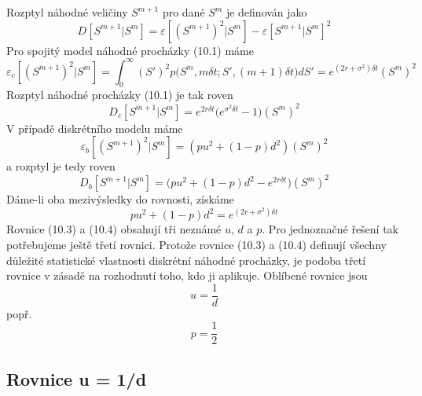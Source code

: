 \documentclass[a4paper]{book}
\begin{document}
Rozptyl náhodné veličiny $S^{m+1}$ pro dané $S^m$ je definován jako
\begin{equation*}
D[S^{m+1}|S^m] = \varepsilon[(S^{m+1})^2|S^m] - \varepsilon[S^{m+1}|S^m]^2
\end{equation*}
Pro spojitý model náhodné procházky (10.1) máme
\begin{equation*}
\varepsilon_c[(S^{m+1})^2|S^m] = \int_0^{\infty} (S')^2  p \Big( S^m, m \delta t; S', (m+1)\delta t \Big) dS' = e^{(2r + \sigma^2)\delta t}(S^m)^2
\end{equation*}
Rozptyl náhodné procházky (10.1) je tak roven
\begin{equation*}
D_c[S^{m+1}|S^m] = e^{2r \delta t} \Big( e^{\sigma^2 \delta t} - 1\Big)(S^m)^2
\end{equation*}
V případě diskrétního modelu máme
\begin{equation*}
\varepsilon_b[(S^{m+1})^2|S^m] = (pu^2 + (1-p)d^2)(S^m)^2
\end{equation*}
a rozptyl je tedy roven
\begin{equation*}
D_b[S^{m+1}|S^m] = \Big( pu^2 + (1 - p)d^2 - e^{2r\delta t}\Big)(S^m)^2
\end{equation*}
Dáme-li oba mezivýsledky do rovnosti, získáme
\begin{equation}
pu^2 + (1 - p)d^2 = e^{(2r + \sigma^2)\delta t}
\end{equation}
Rovnice (10.3) a (10.4) obsahují tři neznámé $u$, $d$ a $p$. Pro jednoznačné řešení tak potřebujeme ještě třetí rovnici. Protože rovnice (10.3) a (10.4) definují všechny důležité statistické vlastnosti diskrétní náhodné procházky, je podoba třetí rovnice v zásadě na rozhodnutí toho, kdo ji aplikuje. Oblíbené rovnice jsou
\begin{equation}
u = \frac{1}{d}
\end{equation}
popř.
\begin{equation}
p = \frac{1}{2}
\end{equation}  

\subsection{Rovnice u = 1/d}
\end{document}
